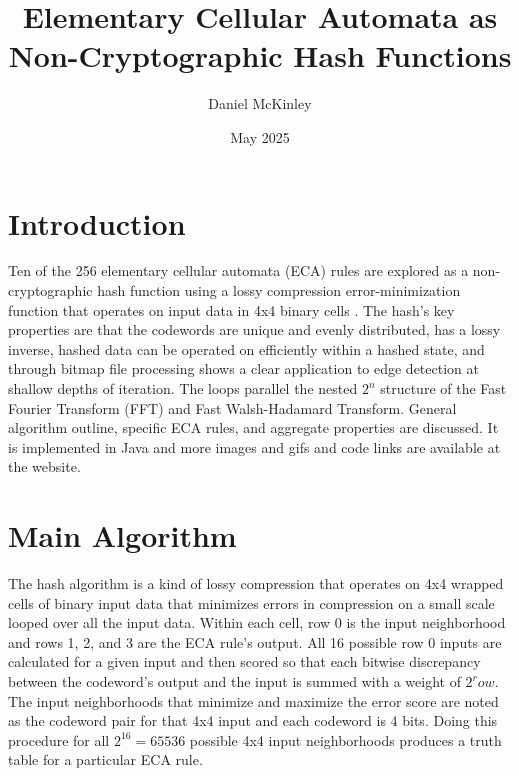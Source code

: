 \documentclass[11pt]{article}
\title{Elementary Cellular Automata as Non-Cryptographic Hash Functions}
\date{May 2025}
\author{Daniel McKinley}
\begin{document}
\maketitle

\section{Introduction}

Ten of the 256 elementary cellular automata (ECA) rules are explored as a non-cryptographic hash function using a lossy compression error-minimization function that operates on input data in 4x4 binary cells \cite{Wolfram}. The hash's key properties are that the codewords are unique and evenly distributed, has a lossy inverse, hashed data can be operated on efficiently within a hashed state, and through bitmap file processing shows a clear application to edge detection at shallow depths of iteration.  The loops parallel the nested $2^n$ structure of the Fast Fourier Transform (FFT) and Fast Walsh-Hadamard Transform. General algorithm outline, specific ECA rules, and aggregate properties are discussed. It is implemented in Java and more images and gifs and code links are available at the website\cite{dmwebsite}.\\

\section{Main Algorithm}
The hash algorithm is a kind of lossy compression that operates on 4x4 wrapped cells of binary input data that minimizes errors in compression on a small scale looped over all the input data. Within each cell, row 0 is the input neighborhood and rows 1, 2, and 3 are the ECA rule's output. All 16 possible row 0 inputs are calculated for a given input and then scored so that each bitwise discrepancy between the codeword's output and the input is summed with a weight of $2^row$. The input neighborhoods that minimize and maximize the error score are noted as the codeword pair for that 4x4 input and each codeword is 4 bits. Doing this procedure for all  $2^{16}=65536$ possible 4x4 input neighborhoods produces a truth table for a particular ECA rule.\\
\end{document}
